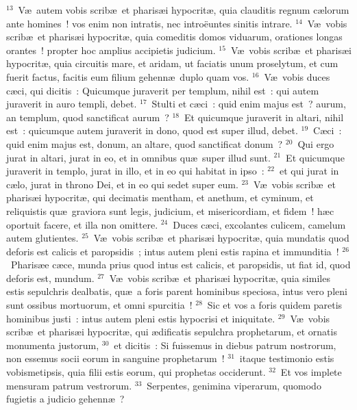 ${}^{13}$~V\ae\ autem vobis scrib\ae\ et pharis\ae i hypocrit\ae , quia clauditis regnum c\ae lorum ante homines~! vos enim non intratis, nec intro\"euntes sinitis intrare.
${}^{14}$~V\ae\ vobis scrib\ae\ et pharis\ae i hypocrit\ae , quia comeditis domos viduarum, orationes longas orantes~! propter hoc amplius accipietis judicium.
${}^{15}$~V\ae\ vobis scrib\ae\ et pharis\ae i hypocrit\ae , quia circuitis mare, et aridam, ut faciatis unum proselytum, et cum fuerit factus, facitis eum filium gehenn\ae\ duplo quam vos.
${}^{16}$~V\ae\ vobis duces c\ae ci, qui dicitis~: Quicumque juraverit per templum, nihil est~: qui autem juraverit in auro templi, debet.
${}^{17}$~Stulti et c\ae ci~: quid enim majus est~? aurum, an templum, quod sanctificat aurum~?
${}^{18}$~Et quicumque juraverit in altari, nihil est~: quicumque autem juraverit in dono, quod est super illud, debet.
${}^{19}$~C\ae ci~: quid enim majus est, donum, an altare, quod sanctificat donum~?
${}^{20}$~Qui ergo jurat in altari, jurat in eo, et in omnibus qu\ae\ super illud sunt.
${}^{21}$~Et quicumque juraverit in templo, jurat in illo, et in eo qui habitat in ipso~:
${}^{22}$~et qui jurat in c\ae lo, jurat in throno Dei, et in eo qui sedet super eum.
${}^{23}$~V\ae\ vobis scrib\ae\ et pharis\ae i hypocrit\ae , qui decimatis mentham, et anethum, et cyminum, et reliquistis qu\ae\ graviora sunt legis, judicium, et misericordiam, et fidem~! h\ae c oportuit facere, et illa non omittere.
${}^{24}$~Duces c\ae ci, excolantes culicem, camelum autem glutientes.
${}^{25}$~V\ae\ vobis scrib\ae\ et pharis\ae i hypocrit\ae , quia mundatis quod deforis est calicis et paropsidis~; intus autem pleni estis rapina et immunditia~!
${}^{26}$~Pharis\ae e c\ae ce, munda prius quod intus est calicis, et paropsidis, ut fiat id, quod deforis est, mundum.
${}^{27}$~V\ae\ vobis scrib\ae\ et pharis\ae i hypocrit\ae , quia similes estis sepulchris dealbatis, qu\ae\ a foris parent hominibus speciosa, intus vero pleni sunt ossibus mortuorum, et omni spurcitia~!
${}^{28}$~Sic et vos a foris quidem paretis hominibus justi~: intus autem pleni estis hypocrisi et iniquitate.
${}^{29}$~V\ae\ vobis scrib\ae\ et pharis\ae i hypocrit\ae , qui \ae dificatis sepulchra prophetarum, et ornatis monumenta justorum,
${}^{30}$~et dicitis~: Si fuissemus in diebus patrum nostrorum, non essemus socii eorum in sanguine prophetarum~!
${}^{31}$~itaque testimonio estis vobismetipsis, quia filii estis eorum, qui prophetas occiderunt.
${}^{32}$~Et vos implete mensuram patrum vestrorum.
${}^{33}$~Serpentes, genimina viperarum, quomodo fugietis a judicio gehenn\ae~?


